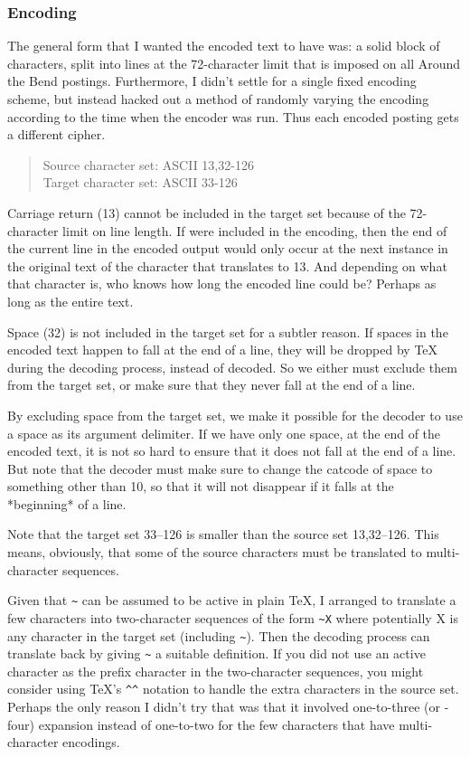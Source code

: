 \subsubsection{Encoding}

The general form that I wanted the encoded text to have was: a solid
block of characters, split into lines at the 72-character limit that
is imposed on all Around the Bend postings. Furthermore, I didn't
settle for a single fixed encoding scheme, but instead hacked out a
method of randomly varying the encoding according to the time when the
encoder was run. Thus each encoded posting gets a different cipher.
\begin{quote}
Source character set: ASCII 13,32-126 \\
Target character set: ASCII 33-126
\end{quote}

Carriage return (13) cannot be included in the target set because of
the 72-character limit on line length. If  were included in
the encoding, then the end of the current line in the encoded output
would only occur at the next instance in the original text of the
character that translates to 13. And depending on what that character
is, who knows how long the encoded line could be? Perhaps as long as
the entire text.

Space (32) is not included in the target set for a subtler reason. If
spaces in the encoded text happen to fall at the end of a line, they
will be dropped by TeX during the decoding process, instead of
decoded. So we either must exclude them from the target set, or make
sure that they never fall at the end of a line.

By excluding space from the target set, we make it possible for the
decoder to use a space as its argument delimiter. If we have only one
space, at the end of the encoded text, it is not so hard to ensure
that it does not fall at the end of a line. But note that the decoder
must make sure to change the catcode of space to something other than
10, so that it will not disappear if it falls at the *beginning* of a
line.

Note that the target set 33--126 is smaller than the source set
13,32--126. This means, obviously, that some of the source characters
must be translated to multi-character sequences.

Given that \verb?~? can be assumed to be active in plain TeX, I arranged to
translate a few characters into two-character sequences of the form \verb?~X?
where potentially X is any character in the target set (including \verb?~?).
Then the decoding process can translate back by giving \verb?~? a suitable
definition. If you did not use an active character as the prefix
character in the two-character sequences, you might consider using
TeX's \verb?^^? notation to handle the extra characters in the source set.
Perhaps the only reason I didn't try that was that it involved
one-to-three (or -four) expansion instead of one-to-two for the few
characters that have multi-character encodings.

